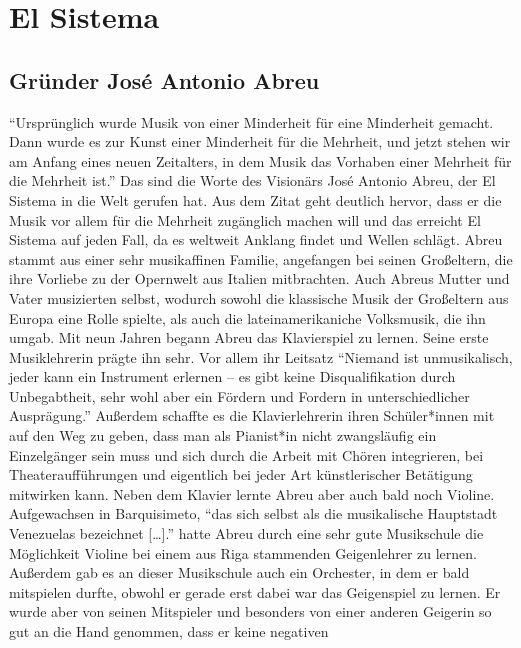 \section{El Sistema}

\subsection{Gründer José Antonio Abreu}

\enquote{Ursprünglich wurde Musik von einer Minderheit für eine Minderheit
gemacht. Dann wurde es zur Kunst einer Minderheit für die Mehrheit, und jetzt
stehen wir am Anfang eines neuen Zeitalters, in dem Musik das Vorhaben einer
Mehrheit für die Mehrheit ist.} \autocite[5]{kaufmann:el_sistema} Das sind die
Worte des Visionärs José Antonio Abreu, der El Sistema in die Welt gerufen hat. Aus dem Zitat geht
deutlich hervor, dass er die Musik vor allem für die Mehrheit zugänglich machen
will und das erreicht El Sistema auf jeden Fall, da es weltweit Anklang findet
und Wellen schlägt. Abreu stammt aus einer sehr musikaffinen Familie, angefangen
bei seinen Großeltern, die ihre Vorliebe zu der Opernwelt aus Italien
mitbrachten. Auch Abreus Mutter und Vater musizierten selbst, wodurch sowohl die
klassische Musik der Großeltern aus Europa eine Rolle spielte, als auch die
lateinamerikaniche Volksmusik, die ihn umgab. Mit neun Jahren begann Abreu das
Klavierspiel zu lernen. Seine erste Musiklehrerin prägte ihn sehr. Vor allem ihr
Leitsatz \enquote{Niemand ist unmusikalisch, jeder kann ein Instrument erlernen
– es gibt keine Disqualifikation durch Unbegabtheit, sehr wohl aber ein Fördern
und Fordern in unterschiedlicher Ausprägung.} \autocite[20]{kaufmann:el_sistema}
Außerdem schaffte es die Klavierlehrerin ihren Schüler*innen mit auf den Weg zu
geben, dass man als Pianist*in nicht zwangsläufig ein Einzelgänger sein muss und
sich durch die Arbeit mit Chören integrieren, bei Theateraufführungen und
eigentlich bei jeder Art künstlerischer Betätigung mitwirken kann. Neben dem
Klavier lernte Abreu aber auch bald noch Violine. Aufgewachsen in Barquisimeto,
\enquote{das sich selbst als die musikalische Hauptstadt Venezuelas
bezeichnet […].} \autocite[22]{kaufmann:el_sistema} hatte Abreu durch eine sehr
gute Musikschule die Möglichkeit Violine bei einem aus Riga stammenden
Geigenlehrer zu lernen. Außerdem gab es an dieser Musikschule auch ein
Orchester, in dem er bald mitspielen durfte, obwohl er gerade erst dabei war das
Geigenspiel zu lernen. Er wurde aber von seinen Mitspieler und besonders von
einer anderen Geigerin so gut an die Hand genommen, dass er keine negativen
